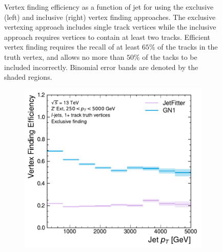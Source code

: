 \begin{figure}[!htbp]
\begin{subfigure}[b]{0.48\textwidth}
    \end{subfigure}
    \caption{
        Vertex finding efficiency as a function of jet \pt for \ttbarljets using the exclusive (left) and inclusive (right) vertex finding approaches.
        The exclusive vertexing approach includes single track vertices while the inclusive approach requires vertices to contain at least two tracks.
        Efficient vertex finding requires the recall of at least $65\%$ of the tracks in the truth vertex, and allows no more than $50\%$ of the tacks to be included incorrectly.
        Binomial error bands are denoted by the shaded regions.
    }
    \label{fig:ttbar_vert_leff}
\end{figure}

\begin{figure}[!htbp]
    \centering
    \begin{subfigure}[b]{0.48\textwidth}
        \centering
        \includegraphics[width=\textwidth]{chapters/gnn_tagger/figs/results/tracks/zprime/zprime_ljet_vert_eff_1+_track_excl.pdf}
    \end{subfigure}
    \quad
    \begin{subfigure}[b]{0.48\textwidth}
        \centering

\end{subfigure}
\end{figure}
